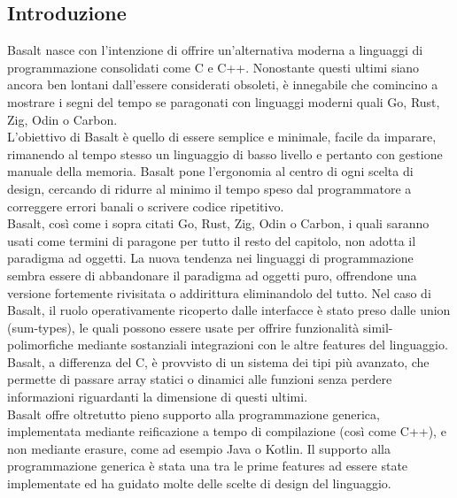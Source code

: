 \subsection{Introduzione}
Basalt nasce con l'intenzione di offrire un'alternativa moderna a linguaggi di programmazione 
consolidati come C e C++. Nonostante questi ultimi siano ancora ben lontani dall'essere considerati 
obsoleti, è innegabile che comincino a mostrare i segni del tempo se
paragonati con linguaggi moderni quali Go, Rust, Zig, Odin o Carbon. \\

L’obiettivo di Basalt è quello di essere semplice e minimale, facile da imparare, rimanendo 
al tempo stesso un linguaggio di basso livello e pertanto con gestione manuale della memoria. 
Basalt pone l'ergonomia al centro di ogni scelta di design, cercando di ridurre al minimo il tempo
speso dal programmatore a correggere errori banali o scrivere codice ripetitivo. \\

Basalt, così come i sopra citati Go, Rust, Zig, Odin o Carbon, i quali saranno usati come 
termini di paragone per tutto il resto del capitolo, non adotta il paradigma ad oggetti. La 
nuova tendenza nei linguaggi di programmazione sembra essere di abbandonare il paradigma ad 
oggetti puro, offrendone una versione fortemente rivisitata o addirittura eliminandolo del tutto. Nel 
caso di Basalt, il ruolo operativamente ricoperto dalle interfacce è stato preso dalle union (sum-types),
le quali possono essere usate per offrire funzionalità simil-polimorfiche mediante sostanziali integrazioni
con le altre features del linguaggio. \\

Basalt, a differenza del C, è provvisto di un sistema dei tipi più avanzato, che permette di
passare array statici o dinamici alle funzioni senza perdere informazioni riguardanti la dimensione di 
questi ultimi. \\

Basalt offre oltretutto pieno supporto alla programmazione generica, implementata mediante reificazione
a tempo di compilazione (così come C++), e non mediante erasure, come ad esempio Java o Kotlin. Il supporto alla 
programmazione generica è stata una tra le prime features ad essere state implementate ed ha guidato
molte delle scelte di design del linguaggio. \\ 



\newpage
 \newpage
 \newpage
 \newpage